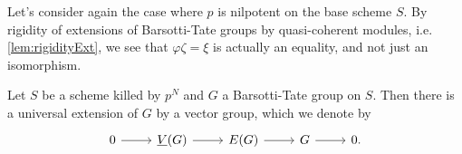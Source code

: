 \begin{rem}[]
	Let's consider again the case where $p$ is 
	nilpotent on the base scheme $S$.
	By rigidity of extensions of Barsotti-Tate groups
	by quasi-coherent modules, i.e. \cref{lem:rigidityExt}, 
	we see that $\varphi\zeta = \xi$ is
	actually an equality, and not just an isomorphism.
\end{rem}


\begin{prop}[]\label{UniversalExtensionConstruction}
	Let $S$ be a scheme killed by $p^N$ and $G$
	a Barsotti-Tate group on $S$.
	Then there is a universal extension of $G$ by a vector group,
	which we denote by
	\begin{equation*}
	\begin{tikzcd}
		0 \arrow[r, "", rightarrow] &
		\underline{V}(G) \arrow[r, "", rightarrow] &
		E(G) \arrow[r, "", rightarrow] &
		G \arrow[r, "", rightarrow] &
		0
	.\end{tikzcd}
	\end{equation*}
\end{prop}
